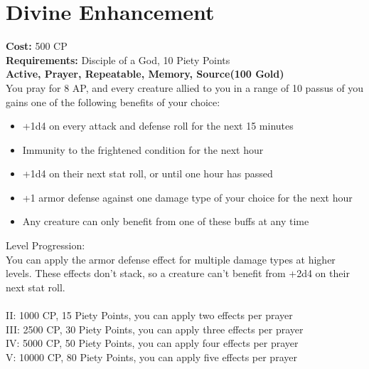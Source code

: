 \section{Divine Enhancement}
\textbf{Cost:} 500 CP\\
\textbf{Requirements:} Disciple of a God, 10 Piety Points \\
\textbf{Active, Prayer, Repeatable, Memory, Source(100 Gold)}\\
You pray for 8 AP, and every creature allied to you in a range of 10 passus of you gains one of the following benefits of your choice:
\begin{itemize}
	\item +1d4 on every attack and defense roll for the next 15 minutes
	\item Immunity to the frightened condition for the next hour
	\item +1d4 on their next stat roll, or until one hour has passed
	\item +1 armor defense against one damage type of your choice for the next hour
	\item Any creature can only benefit from one of these buffs at any time
\end{itemize}

Level Progression:\\
You can apply the armor defense effect for multiple damage types at higher levels. These effects don't stack, so a creature can't benefit from +2d4 on their next stat roll.\\
\\
II: 1000 CP, 15 Piety Points, you can apply two effects per prayer\\
III: 2500 CP, 30 Piety Points, you can apply three effects per prayer\\
IV: 5000 CP, 50 Piety Points, you can apply four effects per prayer\\
V: 10000 CP, 80 Piety Points, you can apply five effects per prayer\\